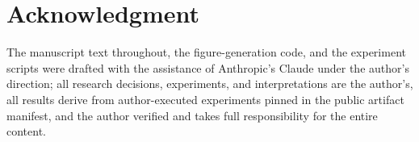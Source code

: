 \documentclass[journal]{IEEEtran}
\begin{document}
\section*{Acknowledgment}
The manuscript text throughout, the figure-generation code, and the experiment scripts were drafted with the assistance of Anthropic's Claude under the author's direction; all research decisions, experiments, and interpretations are the author's, all results derive from author-executed experiments pinned in the public artifact manifest, and the author verified and takes full responsibility for the entire content.



\end{document}
